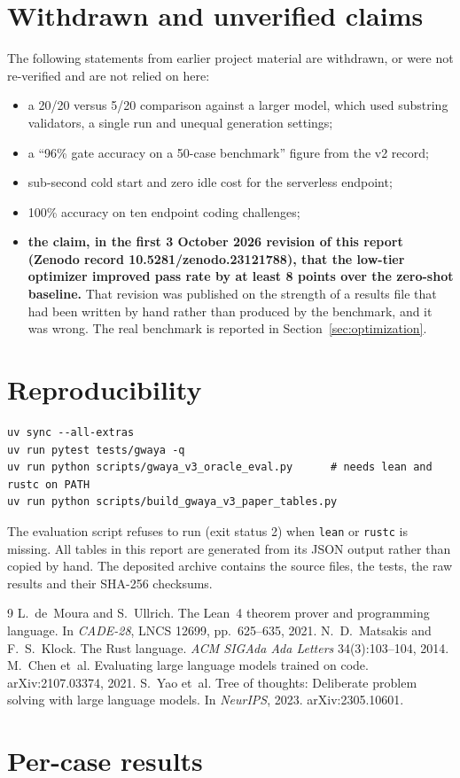 \documentclass[11pt,a4paper,onecolumn]{article}
\begin{document}
\section{Withdrawn and unverified claims}
\label{sec:withdrawn}
The following statements from earlier project material are withdrawn, or were not
re-verified and are not relied on here:
\begin{itemize}
\item a 20/20 versus 5/20 comparison against a larger model, which used substring
validators, a single run and unequal generation settings;
\item a ``96\% gate accuracy on a 50-case benchmark'' figure from the v2 record;
\item sub-second cold start and zero idle cost for the serverless endpoint;
\item 100\% accuracy on ten endpoint coding challenges;
\item \textbf{the claim, in the first 3 October 2026 revision of this report (Zenodo record
10.5281/zenodo.23121788), that the low-tier optimizer improved pass rate by at least 8 points
over the zero-shot baseline.} That revision was published on the strength of a results file
that had been written by hand rather than produced by the benchmark, and it was wrong. The real
benchmark is reported in Section~\ref{sec:optimization}.
\end{itemize}

\section{Reproducibility}
\begin{verbatim}
uv sync --all-extras
uv run pytest tests/gwaya -q
uv run python scripts/gwaya_v3_oracle_eval.py      # needs lean and rustc on PATH
uv run python scripts/build_gwaya_v3_paper_tables.py
\end{verbatim}
The evaluation script refuses to run (exit status 2) when \texttt{lean} or
\texttt{rustc} is missing. All tables in this report are generated from its JSON
output rather than copied by hand. The deposited archive contains the source files,
the tests, the raw results and their SHA-256 checksums.

\begin{thebibliography}{9}
 L.~de~Moura and S.~Ullrich. The Lean~4 theorem prover and
programming language. In \emph{CADE-28}, LNCS 12699, pp.~625--635, 2021.
 N.~D.~Matsakis and F.~S.~Klock. The Rust language.
\emph{ACM SIGAda Ada Letters} 34(3):103--104, 2014.
 M.~Chen et~al. Evaluating large language models trained on code.
arXiv:2107.03374, 2021.
 S.~Yao et~al. Tree of thoughts: Deliberate problem solving with large
language models. In \emph{NeurIPS}, 2023. arXiv:2305.10601.
\end{thebibliography}

\appendix
\section{Per-case results}
\label{app:cases}
\caseTable
\end{document}
